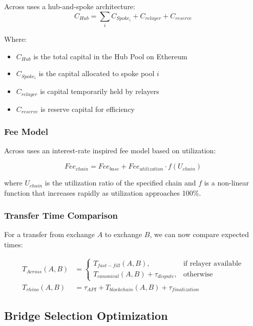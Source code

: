 \documentclass{article}
\begin{document}
Across uses a hub-and-spoke architecture:
\begin{equation}
C_{Hub} = \sum_{i} C_{Spoke_i} + C_{relayer} + C_{reserve}
\end{equation}

Where:
\begin{itemize}
    \item $C_{Hub}$ is the total capital in the Hub Pool on Ethereum
    \item $C_{Spoke_i}$ is the capital allocated to spoke pool $i$
    \item $C_{relayer}$ is capital temporarily held by relayers
    \item $C_{reserve}$ is reserve capital for efficiency
\end{itemize}

\subsubsection{Fee Model}

Across uses an interest-rate inspired fee model based on utilization:

\begin{equation}
Fee_{chain} = Fee_{base} + Fee_{utilization} \cdot f(U_{chain})
\end{equation}

where $U_{chain}$ is the utilization ratio of the specified chain and $f$ is a non-linear function that increases rapidly as utilization approaches 100\%.

\subsubsection{Transfer Time Comparison}

For a transfer from exchange $A$ to exchange $B$, we can now compare expected times:

\begin{align}
T_{Across}(A,B) &= \begin{cases}
T_{fast-fill}(A,B), & \text{if relayer available} \\
T_{canonical}(A,B) + \tau_{dispute}, & \text{otherwise}
\end{cases} \\
T_{rhino}(A,B) &= \tau_{API} + T_{blockchain}(A,B) + \tau_{finalization}
\end{align}

\subsection{Bridge Selection Optimization}
\end{document}
